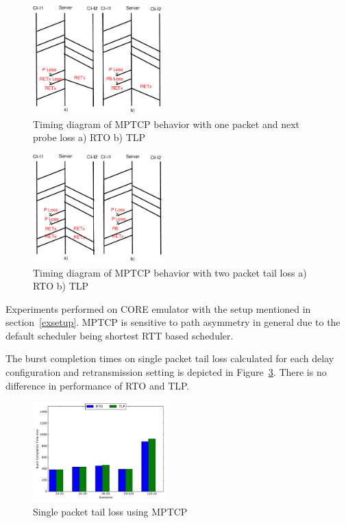 \documentclass[10pt,conference,compsoc]{IEEEtran}
\begin{document}
\begin{figure}[!ht]
\begin{center}
\includegraphics[angle=0, width=0.45\textwidth, natwidth=610, natheight=400]{images/timing1PP.pdf}
\end{center}
\caption{Timing diagram of MPTCP behavior with one packet and next probe loss a) RTO b) TLP}\label{timing1PP}
\end{figure}

\begin{figure}[!ht]
\begin{center}
\includegraphics[angle=0, width=0.45\textwidth, natwidth=610, natheight=400]{images/timing2P.pdf}
\end{center}
\caption{Timing diagram of MPTCP behavior with two packet tail loss a) RTO b) TLP}\label{timing2P}
\end{figure}



Experiments performed on CORE emulator with the setup mentioned in section~\ref{exsetup}. MPTCP is sensitive to path asymmetry in general due to the default scheduler being shortest RTT based scheduler.

The burst completion times on single packet tail loss calculated for each delay configuration and retransmission 
setting is depicted in Figure~\ref{1p}. There is no difference in performance of RTO and TLP. 

\begin{figure}[!ht]
\begin{center}
\includegraphics[angle=0, width=0.46\textwidth,natwidth=578.16,natheight=433.62]{plots/1P.pdf}
\caption{Single packet tail loss using MPTCP}\label{1p}
\end{center}
\end{figure}
\end{document}
